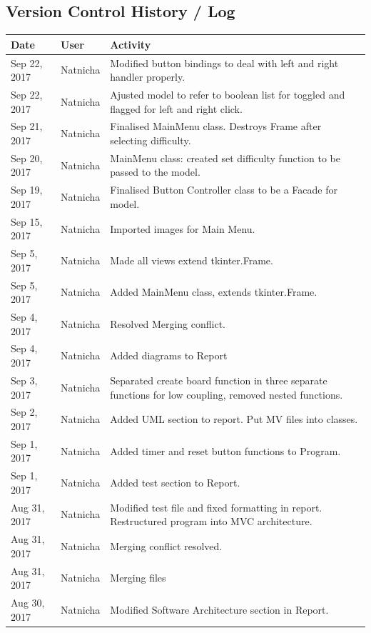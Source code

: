 \documentclass[12pt, a4]{report}
\begin{document}
	\subsection{Version Control History / Log}
	\begin{tabular}{ | p{2cm} | p{2cm} | p{11cm} | }
		\hline
		Date & User & Activity \\
		\hline
		Sep 22, 2017 & Natnicha & Modified button bindings to deal with left and right handler properly. \\
		Sep 22, 2017 & Natnicha & Ajusted model to refer to boolean list for toggled and flagged for left and right click. \\
		Sep 21, 2017 & Natnicha & Finalised MainMenu class. Destroys Frame after selecting difficulty. \\
		Sep 20, 2017 & Natnicha & MainMenu class: created set difficulty function to be passed to the model. \\
		Sep 19, 2017 & Natnicha & Finalised Button Controller class to be a Facade for model. \\
		Sep 15, 2017 & Natnicha & Imported images for Main Menu. \\
		Sep 5, 2017 & Natnicha & Made all views extend tkinter.Frame. \\
		Sep 5, 2017 & Natnicha & Added MainMenu class, extends tkinter.Frame. \\ 
		Sep 4, 2017 & Natnicha & Resolved Merging conflict. \\ 
		Sep 4, 2017 & Natnicha & Added diagrams to Report \\ 
		Sep 3, 2017 & Natnicha & Separated create board function in three separate functions for low coupling, removed nested functions. \\ 
		Sep 2, 2017 & Natnicha & Added UML section to report. Put MV files into classes. \\ 
		Sep 1, 2017 & Natnicha & Added timer and reset button functions to Program. \\ 
		Sep 1, 2017 & Natnicha & Added test section to Report. \\ 
		Aug 31, 2017 & Natnicha & Modified test file and fixed formatting in report. Restructured program into MVC architecture. \\ 
		Aug 31, 2017 & Natnicha & Merging conflict resolved. \\
		Aug 31, 2017 & Natnicha & Merging files \\ 
		Aug 30, 2017 & Natnicha & Modified Software Architecture section in Report. \\ 

		\hline
	\end{tabular}
\end{document}
